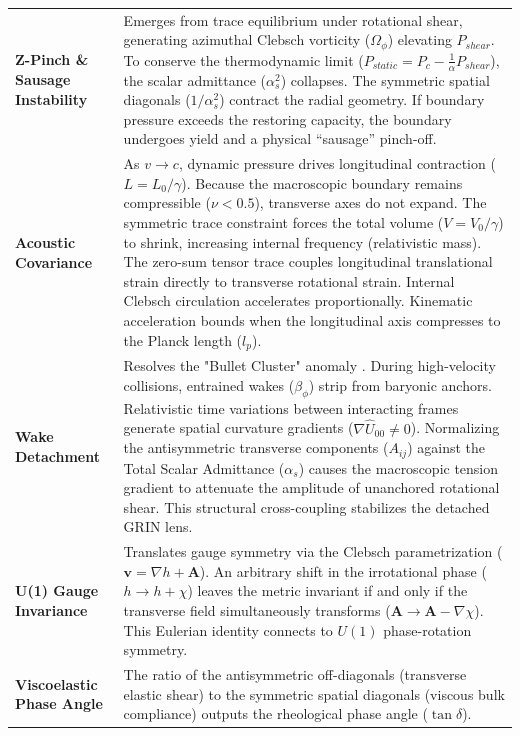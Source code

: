 \begin{longtable}{p{} p{}}
    \textbf{Z-Pinch \& Sausage Instability} & Emerges from trace equilibrium under rotational shear, generating azimuthal Clebsch vorticity ($\Omega_\phi$) elevating $P_{shear}$. To conserve the thermodynamic limit ($P_{static} = P_c - \frac{1}{\alpha}P_{shear}$), the scalar admittance ($\alpha_s^2$) collapses. The symmetric spatial diagonals ($1/\alpha_s^2$) contract the radial geometry. If boundary pressure exceeds the restoring capacity, the boundary undergoes yield and a physical ``sausage'' pinch-off. \\ %
    \textbf{Acoustic Covariance} & As $v \to c$, dynamic pressure drives longitudinal contraction ($L = L_0/\gamma$). Because the macroscopic boundary remains compressible ($\nu < 0.5$), transverse axes do not expand. The symmetric trace constraint forces the total volume ($V = V_0/\gamma$) to shrink, increasing internal frequency (relativistic mass). The zero-sum tensor trace couples longitudinal translational strain directly to transverse rotational strain. Internal Clebsch circulation accelerates proportionally. Kinematic acceleration bounds when the longitudinal axis compresses to the Planck length ($l_p$). \\
    \textbf{Wake Detachment} & Resolves the "Bullet Cluster" anomaly \cite{Clowe2006}. During high-velocity collisions, entrained wakes ($\beta_\phi$) strip from baryonic anchors. Relativistic time variations between interacting frames generate spatial curvature gradients ($\nabla \hat{U}_{00} \neq 0$). Normalizing the antisymmetric transverse components ($A_{ij}$) against the Total Scalar Admittance ($\alpha_s$) causes the macroscopic tension gradient to attenuate the amplitude of unanchored rotational shear. This structural cross-coupling stabilizes the detached GRIN lens. \\
    \textbf{U(1) Gauge Invariance} & Translates gauge symmetry via the Clebsch parametrization ($\mathbf{v} = \nabla h + \mathbf{A}$). An arbitrary shift in the irrotational phase ($h \to h + \chi$) leaves the metric invariant if and only if the transverse field simultaneously transforms ($\mathbf{A} \to \mathbf{A} - \nabla \chi$). This Eulerian identity connects to $U(1)$ phase-rotation symmetry. \\ 
    \textbf{Viscoelastic Phase Angle} & The ratio of the antisymmetric off-diagonals (transverse elastic shear) to the symmetric spatial diagonals (viscous bulk compliance) outputs the rheological phase angle ($\tan \delta$). \\ 

\end{longtable}
